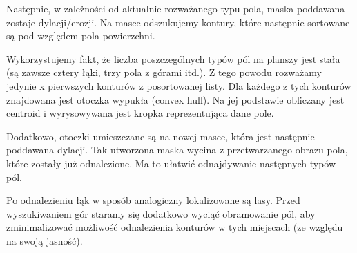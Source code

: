 \documentclass[a4paper]{article}
\begin{document}
	Następnie, w zależności od aktualnie rozważanego typu pola, maska poddawana zostaje dylacji/erozji. Na masce odszukujemy kontury, które następnie sortowane są pod względem pola powierzchni.
	
Wykorzystujemy fakt, że liczba poszczególnych typów pól na planszy jest stała (są zawsze cztery łąki, trzy pola z górami itd.). Z tego powodu rozważamy jedynie x pierwszych konturów z posortowanej listy.
Dla każdego z tych konturów znajdowana jest otoczka wypukła (convex hull). Na jej podstawie obliczany jest centroid i wyrysowywana jest kropka reprezentująca dane pole. 

Dodatkowo, otoczki umieszczane są na nowej masce, która jest następnie poddawana dylacji. Tak utworzona maska wycina z przetwarzanego obrazu pola, które zostały już odnalezione. Ma to ułatwić odnajdywanie następnych typów pól.
	
Po odnalezieniu łąk w sposób analogiczny lokalizowane są lasy. Przed wyszukiwaniem gór staramy się dodatkowo wyciąć obramowanie pól, aby zminimalizować możliwość odnalezienia konturów w tych miejscach (ze względu na swoją jasność).
\end{document}
